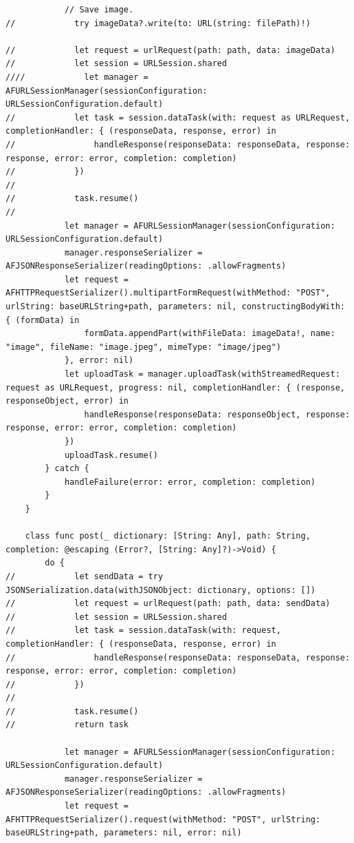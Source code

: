 \begin{lstlisting}
            // Save image.
//            try imageData?.write(to: URL(string: filePath)!)
            
//            let request = urlRequest(path: path, data: imageData)
//            let session = URLSession.shared
////            let manager = AFURLSessionManager(sessionConfiguration: URLSessionConfiguration.default)
//            let task = session.dataTask(with: request as URLRequest, completionHandler: { (responseData, response, error) in
//                handleResponse(responseData: responseData, response: response, error: error, completion: completion)
//            })
//            
//            task.resume()
//            
            let manager = AFURLSessionManager(sessionConfiguration: URLSessionConfiguration.default)
            manager.responseSerializer = AFJSONResponseSerializer(readingOptions: .allowFragments)
            let request = AFHTTPRequestSerializer().multipartFormRequest(withMethod: "POST", urlString: baseURLString+path, parameters: nil, constructingBodyWith: { (formData) in
                formData.appendPart(withFileData: imageData!, name: "image", fileName: "image.jpeg", mimeType: "image/jpeg")
            }, error: nil)
            let uploadTask = manager.uploadTask(withStreamedRequest: request as URLRequest, progress: nil, completionHandler: { (response, responseObject, error) in
                handleResponse(responseData: responseObject, response: response, error: error, completion: completion)
            })
            uploadTask.resume()
        } catch {
            handleFailure(error: error, completion: completion)
        }
    }
    
    class func post(_ dictionary: [String: Any], path: String, completion: @escaping (Error?, [String: Any]?)->Void) {
        do {
//            let sendData = try JSONSerialization.data(withJSONObject: dictionary, options: [])
//            let request = urlRequest(path: path, data: sendData)
//            let session = URLSession.shared
//            let task = session.dataTask(with: request, completionHandler: { (responseData, response, error) in
//                handleResponse(responseData: responseData, response: response, error: error, completion: completion)
//            })
//            
//            task.resume()
//            return task
            
            let manager = AFURLSessionManager(sessionConfiguration: URLSessionConfiguration.default)
            manager.responseSerializer = AFJSONResponseSerializer(readingOptions: .allowFragments)
            let request = AFHTTPRequestSerializer().request(withMethod: "POST", urlString: baseURLString+path, parameters: nil, error: nil)
            

\end{lstlisting}
